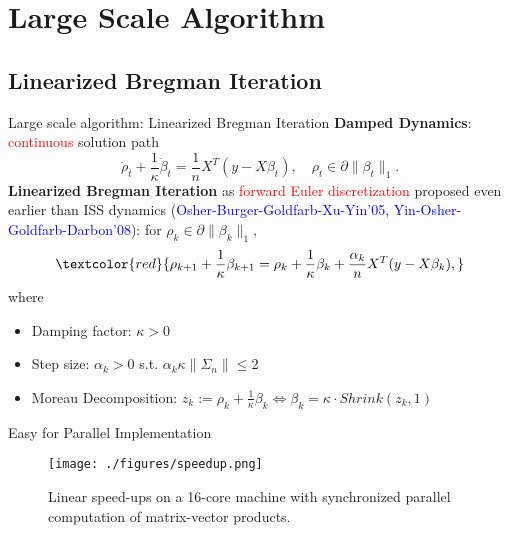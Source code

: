 \documentclass[slidestop,compress,9pt,epsfig,color]{beamer}
\theoremstyle{example}
\begin{document}
\section[Algorithm]{Large Scale Algorithm}
\subsection{Linearized Bregman Iteration}
\begin{frame}{Large scale algorithm: Linearized Bregman Iteration}
\textbf{Damped Dynamics}: \textcolor{red}{continuous} solution path %
\begin{equation} \label{eq:lb-iss}
 \dot\rho_t + \frac{1}{\kappa}  \dot\beta_t =\frac{1}{n} X^T(y-X\beta_t),\quad\rho_t\in \partial\|\beta_t\|_1.
\end{equation}
\textbf{Linearized Bregman Iteration} as \textcolor{red}{forward Euler discretization} proposed even earlier than ISS dynamics (\textcolor{blue}{Osher-Burger-Goldfarb-Xu-Yin'05, Yin-Osher-Goldfarb-Darbon'08}): for $\rho_k \in \partial \|\beta_k\|_1$,
\begin{equation} \label{eq:lbi}
\textcolor{red}{\rho_{k+1} + \frac{1}{\kappa} \beta_{k+1} =  \rho_{k} + \frac{1}{\kappa} \beta_{k} + \frac{\alpha_k}{n} X^T(y-X\beta_k), }
\end{equation}
where
\begin{itemize}
\item Damping factor: $\kappa> 0$
\item Step size: $\alpha_k>0$ s.t. $\alpha_k \kappa \|\Sigma_n\| \leq 2$
\item Moreau Decomposition: $z_k := \rho_k + \frac{1}{\kappa} \beta_k \Leftrightarrow \beta_k = \kappa \cdot Shrink(z_k,1)$
\end{itemize}
\end{frame}

\begin{frame}{Easy for Parallel Implementation}
\begin{figure}[!t]
    \texttt{[image: ./figures/speedup.png]}
    \caption{Linear speed-ups on a 16-core machine with synchronized parallel computation of matrix-vector products.}
\end{figure}

\end{frame}
\end{document}
